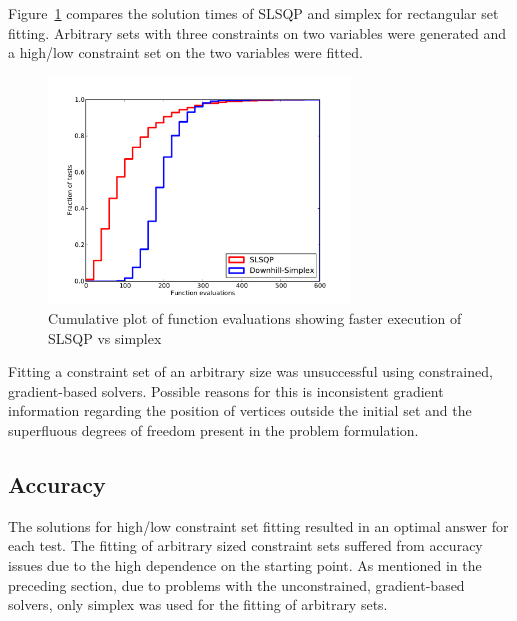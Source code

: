 Figure~\ref{fig:cubefittime} compares the solution times of SLSQP and simplex for rectangular set fitting.
Arbitrary sets with three constraints on two variables were generated and a high/low constraint set on the two variables were fitted.

\begin{figure}[htbp]
  \centering
    \includegraphics[width=8cm]{graph/cubefittime}
  \caption[SLSQP and simplex calculation time comparison]{Cumulative plot of function evaluations showing faster execution of SLSQP vs simplex}
  \label{fig:cubefittime}
\end{figure}

Fitting a constraint set of an arbitrary size was unsuccessful using constrained, gradient-based solvers.
Possible reasons for this is inconsistent gradient information regarding the position of vertices outside the initial set and the superfluous degrees of freedom present in the problem formulation.

\subsection{Accuracy}
The solutions for high/low constraint set fitting resulted in an optimal answer for each test.
The fitting of arbitrary sized constraint sets suffered from accuracy issues due to the high dependence on the starting point.
As mentioned in the preceding section, due to problems with the unconstrained, gradient-based solvers, only simplex was used for the fitting of arbitrary sets.


